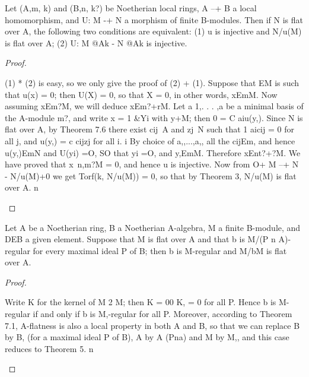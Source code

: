 \begin{theorem}[Theorem 22.5]\label{mcrt-auto-theorem-22-5}
\begin{mathematicalrecord}
Let (A,m, k) and (B,n, k?) be Noetherian local rings,
A --+ B a local homomorphism,  and U: M -+ N a morphism of finite
B-modules. Then if N is flat over A, the following two conditions are
equivalent:
   (1) u is injective and N/u(M) is flat over A;
   (2) U: M @Ak - N @Ak is injective.
\end{mathematicalrecord}
\end{theorem}
\begin{proof}
\begin{mathematicalrecord}
(1) * (2) is easy, so we only give the proof of (2) + (1). Suppose that
EM is such that u(x) = 0; then U(X) = 0, so that X = 0, in other words,
xEmM.          Now assuming xEm?M,         we will deduce xEm?+rM.         Let
{a 1,. . . ,a} be  a minimal basis of the A-module  m?, and  write  x = 1 &Yi
with y+M; then 0 = C aiu(y,). Since N is flat over A, by Theorem 7.6 there
exist cij~A and zj~N such that
             1 aicij = 0 for all j, and u(y,) = c cijzj for all i.
                                                  i
By choice of a,,...,a,,    all the cijEm, and hence u(y,)EmN     and
U(yi) =O, SO that yi =O, and y,EmM. Therefore xEnt?+?M.     We have
proved that x~n,m?M       = 0, and hence u is injective. Now from
O+ M --+ N - N/u(M)+0         we get Torf(k, N/u(M)) = 0, so that by
Theorem 3, N/u(M) is flat over A. n
\end{mathematicalrecord}
\end{proof}


\begin{theorem}[Theorem 22.6]\label{mcrt-auto-theorem-22-6}
\begin{mathematicalrecord}
Let A be a Noetherian ring, B a Noetherian A-algebra, M
a finite B-module, and DEB a given element. Suppose that M is flat over
A and that b is M/(P n A)-regular for every maximal ideal P of B; then b is
M-regular and M/bM is flat over A.
\end{mathematicalrecord}
\end{theorem}
\begin{proof}
\begin{mathematicalrecord}
Write K for the kernel of M 2 M; then K = 00 K, = 0 for all P.
Hence b is M-regular if and only if b is M,-regular  for all P. Moreover,
according to Theorem 7.1, A-flatness is also a local property in both A
and B, so that we can replace B by B, (for a maximal ideal P of B), A by
A (Pna) and M by M,, and this case reduces to Theorem 5. n
\end{mathematicalrecord}
\end{proof}



